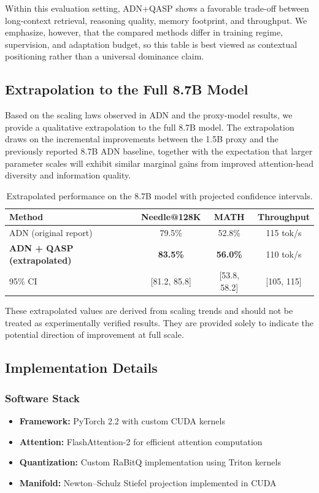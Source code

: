 \documentclass[twocolumn]{article}
\begin{document}
Within this evaluation setting, ADN+QASP shows a favorable trade-off between long-context retrieval, reasoning quality, memory footprint, and throughput. We emphasize, however, that the compared methods differ in training regime, supervision, and adaptation budget, so this table is best viewed as contextual positioning rather than a universal dominance claim.

\subsection{Extrapolation to the Full 8.7B Model}

Based on the scaling laws observed in ADN and the proxy-model results, we provide a qualitative extrapolation to the full 8.7B model. The extrapolation draws on the incremental improvements between the 1.5B proxy and the previously reported 8.7B ADN baseline, together with the expectation that larger parameter scales will exhibit similar marginal gains from improved attention-head diversity and information quality.

\begin{table}[htbp]
\centering
\caption{Extrapolated performance on the 8.7B model with projected confidence intervals.}
\label{tab:extrapolation}
\begin{tabular}{@{}lccc@{}}
\toprule
\textbf{Method} & \textbf{Needle@128K} & \textbf{MATH} & \textbf{Throughput} \\
\midrule
ADN (original report) \cite{adn} & 79.5\% & 52.8\% & 115 tok/s \\
\textbf{ADN + QASP (extrapolated)} & \textbf{83.5\%} & \textbf{56.0\%} & 110 tok/s \\
95\% CI & [81.2, 85.8] & [53.8, 58.2] & [105, 115] \\
\bottomrule
\end{tabular}
\end{table}

These extrapolated values are derived from scaling trends and should not be treated as experimentally verified results. They are provided solely to indicate the potential direction of improvement at full scale.

\subsection{Implementation Details}

\subsubsection{Software Stack}
\begin{itemize}
    \item \textbf{Framework:} PyTorch 2.2 with custom CUDA kernels
    \item \textbf{Attention:} FlashAttention-2 for efficient attention computation
    \item \textbf{Quantization:} Custom RaBitQ implementation using Triton kernels
    \item \textbf{Manifold:} Newton--Schulz Stiefel projection implemented in CUDA
\end{itemize}
\end{document}
